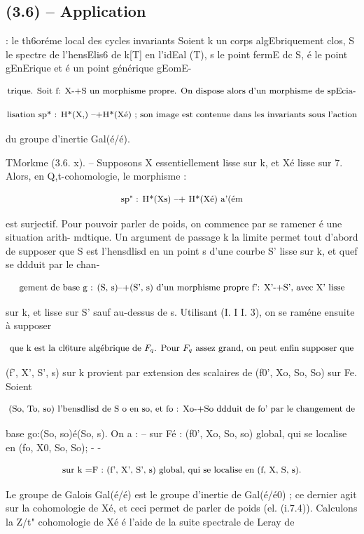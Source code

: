\documentclass[11pt]{article}
\theoremstyle{remark}
\begin{document}
\subsection*{(3.6) -- Application}

: le th6oréme local des cycles invariants Soient k un corps algEbriquement clos, S le spectre de l'hensElis6 de k[T] en l'idEal (T), s le point fermE dc S, é le point gEnErique et é un point générique gEomE-

\[\text{\small trique. Soit f: X-+S un morphisme propre. On dispose alors d'un morphisme de spEcia-}\]

\[\text{\small lisation sp* : H*(X,) --+H*(Xé) ; son image est contenue dans les invariants sous l'action}\]

du groupe d'inertie Gal(é/é).

TMorkme (3.6. x). -- Supposons X essentiellement lisse sur k, et Xé lisse sur 7. Alors, en Q,t-cohomologie, le morphisme :

\[\text{\small sp" : H*(Xs) --+ H*(Xé) a'(ém}\]

est surjectif. Pour pouvoir parler de poids, on commence par se ramener é une situation arith- mdtique. Un argument de passage k la limite permet tout d'abord de supposer que S est l'hensdlisd en un point s d'une courbe S' lisse sur k, et quef se ddduit par le chan-

\[\text{\small gement de base g : (S, s)--+(S', s) d'un morphisme propre f': X'-+S', avec X' lisse}\]

sur k, et lisse sur S' sauf au-dessus de s. Utilisant (I. I I. 3), on se raméne ensuite à supposer

\[\text{\small que k est la cl6ture algébrique de \(F_q\). Pour \(F_q\) assez grand, on peut enfin supposer que}\]

(f', X', S', s) sur k provient par extension des scalaires de (f0', Xo, So, So) sur Fe. Soient

\[\text{\small (So, To, so) l'bensdlisd de S o en so, et fo : Xo-+So ddduit de fo' par le changement de}\]

base go:(So, so)é(So, s). On a : -- sur Fé : (f0', Xo, So, so) global, qui se localise en (fo, X0, So, So); - -

\[\text{\small sur k =F : (f', X', S', s) global, qui se localise en (f, X, S, s).}\]

Le groupe de Galois Gal(é/é) est le groupe d'inertie de Gal(é/é0) ; ce dernier agit sur la cohomologie de Xé, et ceci permet de parler de poids (el. (i.7.4)). Calculons la Z/t" cohomologie de Xé é l'aide de la suite spectrale de Leray de
\end{document}
